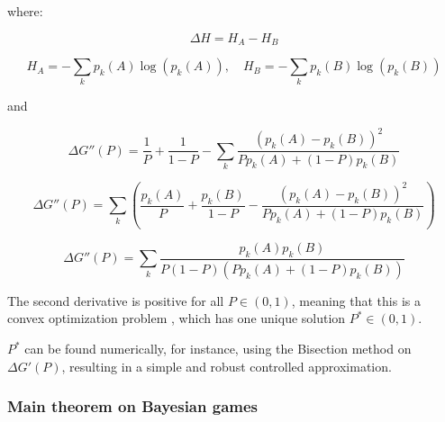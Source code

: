 \documentclass{article}
\theoremstyle{definition}
\begin{document}
where:

\begin{equation}
    \Delta H = H_A - H_B
\end{equation}

\begin{equation}
    H_A = - \sum_k p_k(A) \log(p_k(A)), \quad H_B = - \sum_k p_k(B) \log(p_k(B))
\end{equation}

and

\begin{equation}
    \Delta G''(P) = \frac{1}{P} + \frac{1}{1-P} - \sum_k \frac{(p_k(A)-p_k(B))^2}{P p_k(A) + (1-P) p_k(B)}
\end{equation}

\begin{equation}
    \Delta G''(P) = \sum_k  \left ( \frac{p_k(A)}{P} + \frac{p_k(B)}{1-P} - \frac{(p_k(A)-p_k(B))^2}{P p_k(A) + (1-P) p_k(B)} \right )
\end{equation}

\begin{equation}
    \Delta G''(P) = \sum_k  \frac{p_k(A) p_k(B)}{P(1-P)(P p_k(A) + (1-P) p_k(B))}
\end{equation}

The second derivative is positive for all $P \in (0,1)$, meaning that this is a convex optimization problem \cite{book:ConvexOpt}, which has one unique solution $P^* \in (0,1)$.

$P^*$ can be found numerically, for instance, using the Bisection method \cite{book:NumericalRecipes} on $\Delta G'(P)$, resulting in a simple and robust controlled approximation.


\subsubsection{Main theorem on Bayesian games}
\end{document}
